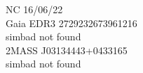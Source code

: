 NC 16/06/22\\
Gaia EDR3 2729232673961216\\
simbad not found\\

2MASS J03134443+0433165\\
simbad not found\\